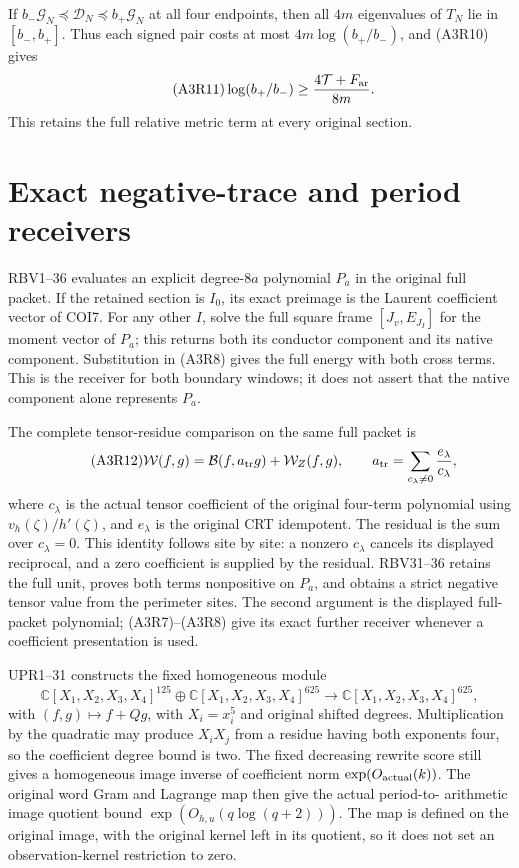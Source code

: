 If $b_-\mathscr G_N\preceq\mathscr D_N\preceq b_+\mathscr G_N$
at all four endpoints, then all $4m$ eigenvalues of $T_N$ lie in
$[b_-,b_+]$. Thus each signed pair costs at most
$4m\log(b_+/b_-)$, and (A3R10) gives
\begin{equation}\tag{A3R11}
 \log(b_+/b_-)\ge\frac{4\mathcal T+F_{\rm ar}}{8m}.
\end{equation}
This retains the full relative metric term at every original section.

\section{Exact negative-trace and period receivers}
RBV1--36 evaluates an explicit degree-$8a$ polynomial $P_a$ in the
original full packet. If the retained section is $I_0$, its exact preimage
is the Laurent coefficient vector of COI7. For any other $I$,
solve the full square frame $[J_v,E_{J_I}]$ for the moment vector of $P_a$;
this returns both its conductor component and its native component.
Substitution in (A3R8) gives the full energy with both cross terms.
This is the receiver for both boundary windows; it does not assert that
the native component alone represents $P_a$.

The complete tensor-residue comparison on the same full packet is
\begin{equation}\tag{A3R12}
 \mathcal W(f,g)=\mathcal B(f,a_{\rm tr}g)+\mathcal W_Z(f,g),
 \qquad a_{\rm tr}=\sum_{c_\lambda\ne0}\frac{e_\lambda}{c_\lambda},
\end{equation}
where $c_\lambda$ is the actual tensor coefficient of the original
four-term polynomial using $v_h(\zeta)/h'(\zeta)$, and $e_\lambda$ is the
original CRT idempotent. The residual is the sum over $c_\lambda=0$.
This identity follows site by site: a nonzero $c_\lambda$ cancels its
displayed reciprocal, and a zero coefficient is supplied by the residual.
RBV31--36 retains the full unit, proves both terms nonpositive on $P_a$,
and obtains a strict negative tensor value from the perimeter sites.
The second argument is the displayed full-packet polynomial; (A3R7)--(A3R8)
give its exact further receiver whenever a coefficient presentation is used.

UPR1--31 constructs the fixed homogeneous module
\[
\mathbb C[X_1,X_2,X_3,X_4]^{125}\oplus
\mathbb C[X_1,X_2,X_3,X_4]^{625}\longrightarrow
\mathbb C[X_1,X_2,X_3,X_4]^{625},
\]
with $(f,g)\mapsto f+Qg$,
with $X_i=x_i^5$ and original shifted degrees.
Multiplication by the quadratic may produce $X_iX_j$ from a residue
having both exponents four, so the coefficient degree bound is two.
The fixed decreasing rewrite score still gives a homogeneous image inverse
of coefficient norm $\exp(O_{\rm actual}(k))$.
The original word Gram and Lagrange map then give the actual period-to-
arithmetic image quotient bound $\exp(O_{h,u}(q\log(q+2)))$.
The map is defined on the original image, with the original kernel left
in its quotient, so it does not set an observation-kernel restriction to zero.

